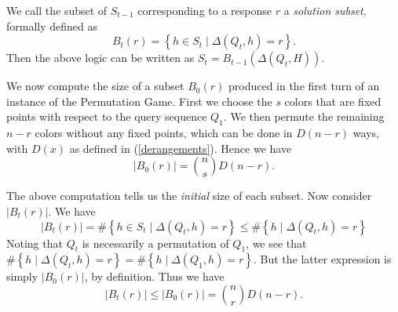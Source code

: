 \documentclass[12pt, a4paper]{article}
\begin{document}
	We call the subset of $S_{t-1}$ corresponding to a response $r$ a \textit{solution subset}, formally defined as 
	\begin{equation*}
		B_t(r) = \left\{h\in S_t\mid \Delta(Q_t, h) = r\right\}.
	\end{equation*}
	Then the above logic can be written as $S_t = B_{t-1}(\Delta(Q_t,H))$.
	
	We now compute the size of a subset $B_0(r)$ produced in the first turn of an instance of the Permutation Game. First we choose the $s$ colors that are fixed points with respect to the query sequence $Q_1$. We then permute the remaining $n-r$ colors without any fixed points, which can be done in $D(n - r)$ ways, with $D(x)$ as defined in (\ref{derangements}). Hence we have
	\begin{equation*}
		|B_0(r)| = \binom{n}{s}D(n-r).
	\end{equation*}
	
	The above computation tells us the \textit{initial} size of each subset. Now consider $|B_t(r)|$. We have 
	\begin{equation*}
	|B_t(r)| = \#\left\{h\in S_t\mid \Delta(Q_t, h) = r\right\} \leq \#\left\{h\mid \Delta(Q_t, h) = r\right\}
	\end{equation*} 
	Noting that $Q_t$ is necessarily a permutation of $Q_1$, we see that $\#\left\{h\mid \Delta(Q_t, h) = r\right\} = \#\left\{h\mid \Delta(Q_1, h) = r\right\}$. But the latter expression is simply $|B_0(r)|$, by definition. Thus we have
	\begin{equation*}
		|B_t(r)|\le |B_0(r)| = \binom{n}{r}D(n-r).
	\end{equation*}
\end{document}
